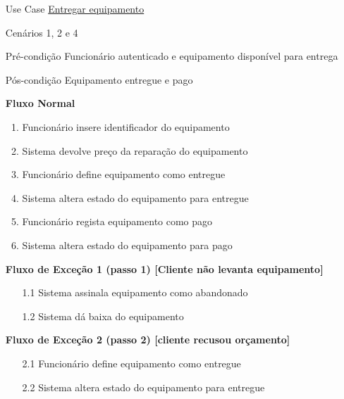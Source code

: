 \documentclass[../relatorio.tex]{subfiles}
\begin{document}
\begin{itemize}
    \item[Use Case] {\underline{Entregar equipamento}}
    \item[Cenários] {1, 2 e 4}
    \item[Pré-condição] {Funcionário autenticado e equipamento disponível para entrega}
    \item[Pós-condição] {Equipamento entregue e pago}
          \begin{flushleft}
              \textbf{Fluxo Normal}
          \end{flushleft}
          \begin{enumerate}
              \item Funcionário insere identificador do equipamento
              \item Sistema devolve preço da reparação do equipamento
              \item Funcionário define equipamento como entregue
              \item Sistema altera estado do equipamento para entregue
              \item Funcionário regista equipamento como pago
              \item Sistema altera estado do equipamento para pago
          \end{enumerate}
          \begin{flushleft}
              \textbf{Fluxo de Exceção 1 (passo 1) [Cliente não levanta equipamento]}
          \end{flushleft}
          \begin{itemize}
              \item[1.1]{Sistema assinala equipamento como abandonado}
              \item[1.2]{Sistema dá baixa do equipamento}
          \end{itemize}

          \begin{flushleft}
              \textbf{Fluxo de Exceção 2 (passo 2) [cliente recusou orçamento]}
          \end{flushleft}
          \begin{itemize}
              \item[2.1] Funcionário define equipamento como entregue
              \item[2.2] Sistema altera estado do equipamento para entregue
          \end{itemize}
\end{itemize}
\end{document}
